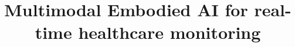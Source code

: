 \documentclass[conference]{IEEEtran}
\begin{document}
\title{Multimodal Embodied AI for real-time healthcare monitoring}

\end{document}
